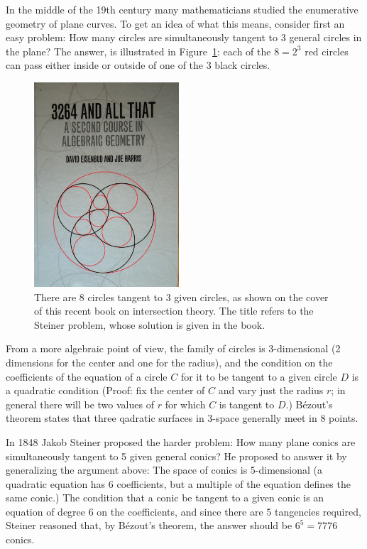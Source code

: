 \documentclass[11pt, oneside]{article}   	%
\begin{document}
In the middle of the 19th century many mathematicians studied the enumerative geometry of plane curves. To get an idea of what this means, consider first an easy problem: How many circles are simultaneously tangent to 3 general circles in the plane? The answer, is illustrated in Figure~\ref{3264Book}: each of the $8 = 2^{3}$ red circles can pass either inside or outside 
of one of the 3 black circles. \begin{figure}\label{3264Book}
\centerline {\includegraphics[height=3in]{3264Book.jpg}}
 \caption{There are 8 circles tangent to 3 given circles, as shown on the cover of this recent book
 on intersection theory. The title refers to the Steiner problem, whose solution is given in the book.}
\end{figure}
From a more algebraic point of view, the family of circles is 3-dimensional
(2 dimensions for the center and one for the radius), and the condition on the coefficients of the
equation of a circle $C$ for it to be tangent to a given circle $D$ is a quadratic condition (Proof: fix the center of $C$ and vary just the radius $r$; in general there will be two values of $r$ for which
$C$ is tangent to $D$.) B\'ezout's theorem states that three qadratic surfaces in 3-space generally
meet in 8 points.

In 1848 Jakob Steiner proposed the harder problem: How many plane conics are simultaneously tangent to 5 given general conics? He proposed to answer it by generalizing the argument above: The space of
conics is 5-dimensional (a quadratic equation has 6 coefficients, but a multiple of the equation defines the same conic.) The condition that a conic be tangent to a given conic is an equation of degree 6 on the coefficients, and since there are 5 tangencies required, Steiner reasoned that, by B\'ezout's theorem, the answer should be $6^{5} = 7776$ conics.
\end{document}
